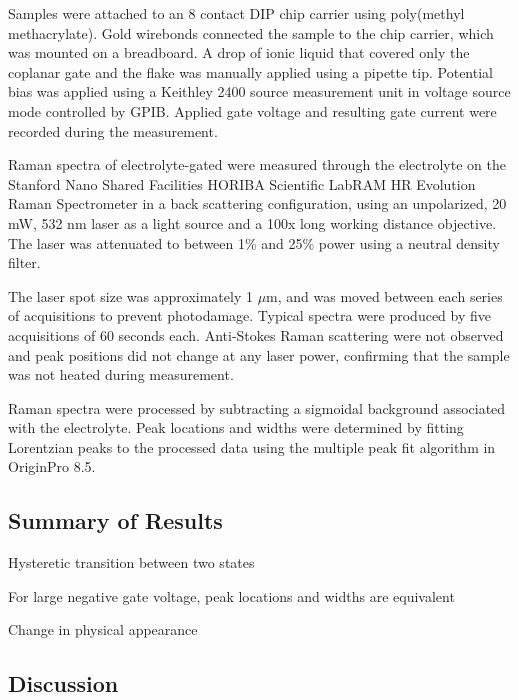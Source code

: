 Samples were attached to an 8 contact DIP chip carrier using poly(methyl methacrylate). Gold wirebonds connected the sample to the chip carrier, which was mounted on a breadboard. A drop of ionic liquid that covered only the coplanar gate and the \rucl flake was manually applied using a pipette tip. Potential bias was applied using a Keithley 2400 source measurement unit in voltage source mode controlled by GPIB. Applied gate voltage and resulting gate current were recorded during the measurement.

Raman spectra of electrolyte-gated \rucl were measured through the electrolyte on the Stanford Nano Shared Facilities HORIBA Scientific LabRAM HR Evolution Raman Spectrometer in a back scattering configuration, using an unpolarized, 20 mW, 532 nm laser as a light source and a 100x long working distance objective. The laser was attenuated to between 1\% and 25\% power using a neutral density filter.

The laser spot size was approximately 1 $\mu$m, and was moved between each series of acquisitions to prevent photodamage. Typical spectra were produced by five acquisitions of 60 seconds each. Anti-Stokes Raman scattering were not observed and peak positions did not change at any laser power, confirming that the sample was not heated during measurement.

Raman spectra were processed by subtracting a sigmoidal background associated with the electrolyte. Peak locations and widths were determined by fitting Lorentzian peaks to the processed data using the multiple peak fit algorithm in OriginPro 8.5.

\subsection{Summary of Results}
Hysteretic transition between two states

For large negative gate voltage, peak locations and widths are equivalent

Change in physical appearance





\subsection{Discussion}